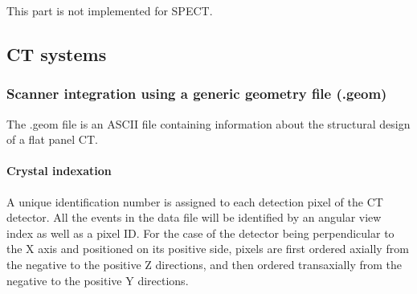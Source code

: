 \documentclass[a4paper, 11pt]{article}
\begin{document}
This part is not implemented for SPECT.


\subsection{CT systems}
\label{ss_scanner_integration_CT}

\subsubsection{Scanner integration using a generic geometry file (.geom)}
\label{sss_scanner_integration_CT_geom}

The .geom file is an ASCII file containing information about the structural design of a flat panel CT.

\paragraph{Crystal indexation} 
A unique identification number is assigned to each detection pixel of the CT detector.
All the events in the data file will be identified by an angular view index as well as a pixel ID.
For the case of the detector being perpendicular to the X axis and positioned on its positive side, pixels are first ordered axially from the negative to the positive Z directions, and then ordered transaxially from the negative to the positive Y directions.
\end{document}
